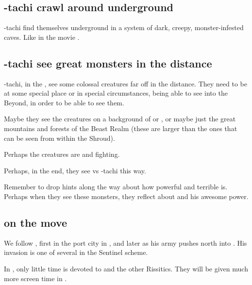 \subsection{\Shilred-tachi crawl around underground}
\Shilred-tachi find themselves underground in a system of dark, creepy, monster-infested caves. Like in the movie \cite{Movie:HouseoftheDead}. 








\subsection{\Shilred{}-tachi see great monsters in the distance}
\Shilred-tachi, \travelling in the \Wylde{}, see some colossal creatures far off in the distance. They need to be at some special place or in special circumstances, being able to see into the Beyond, in order to be able to see them. 

Maybe they see the creatures on a background of \Nyx{} or \Machai{}, or maybe just the great mountains and forests of the Beast Realm (these are larger than the ones that can be seen from within the Shroud). 

Perhaps the creatures are \dragons{} and \banes{} fighting. 

Perhaps, in the end, they see \Ishnaruchaefir{} vs \Teshrial-tachi this way. 

Remember to drop hints along the way about how powerful and terrible \Ishnaruchaefir{} is. Perhaps when they see these monsters, they reflect about \Ishnaruchaefir{} and his awesome power. 







\subsection{\Narkiza{} on the move}

We follow \Narkiza{}, first in the port city in \Scyrum, and later as his army pushes north into \Velcad{}. His invasion is one of several  in the Sentinel scheme.

In \TwilightAngelRememberEmph, only little time is devoted to \Narkiza{} and the other Rissitics. They will be given much more screen time in \emph{\CarzainWithRedcorBook}. 

